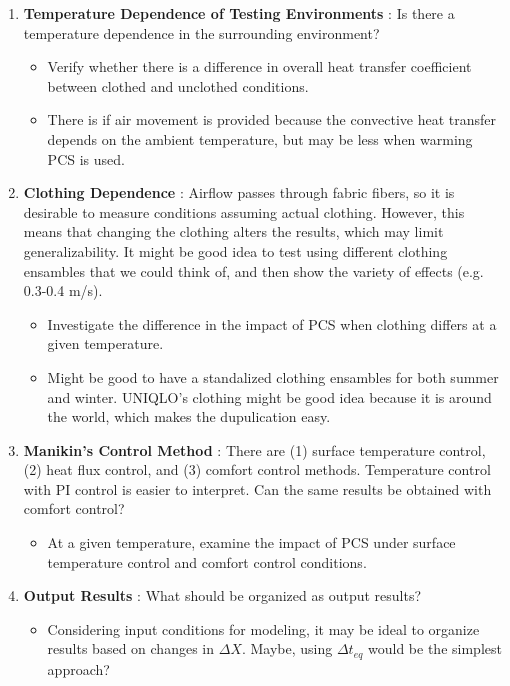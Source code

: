 \documentclass[11pt]{article}
\begin{document}
\begin{enumerate}
    \item \textbf{Temperature Dependence of Testing Environments}
    : Is there a temperature dependence in the surrounding environment?
    \begin{itemize}
        \item Verify whether there is a difference in overall heat transfer coefficient between clothed and unclothed conditions.
        \item There is if air movement is provided because the convective heat transfer depends on the ambient temperature, but may be less when warming PCS is used.
    \end{itemize}

    \item \textbf{Clothing Dependence}
    : Airflow passes through fabric fibers, so it is desirable to measure conditions assuming actual clothing. However, this means that changing the clothing alters the results, which may limit generalizability.
    It might be good idea to test using different clothing ensambles that we could think of, and then show the variety of effects (e.g. 0.3-0.4 m/s).
    \begin{itemize}
        \item Investigate the difference in the impact of PCS when clothing differs at a given temperature.
        \item Might be good to have a standalized clothing ensambles for both summer and winter. UNIQLO's clothing might be good idea because it is around the world, which makes the dupulication easy.
    \end{itemize}

    \item \textbf{Manikin’s Control Method}
    : There are (1) surface temperature control, (2) heat flux control, and (3) comfort control methods. Temperature control with PI control is easier to interpret. Can the same results be obtained with comfort control?
    \begin{itemize}
        \item At a given temperature, examine the impact of PCS under surface temperature control and comfort control conditions.
    \end{itemize}

    \item \textbf{Output Results}
    : What should be organized as output results?
    \begin{itemize}
        \item Considering input conditions for modeling, it may be ideal to organize results based on changes in $\Delta X$. Maybe, using $\Delta t_{eq}$ would be the simplest approach?
    \end{itemize}

\end{enumerate}
\end{document}
